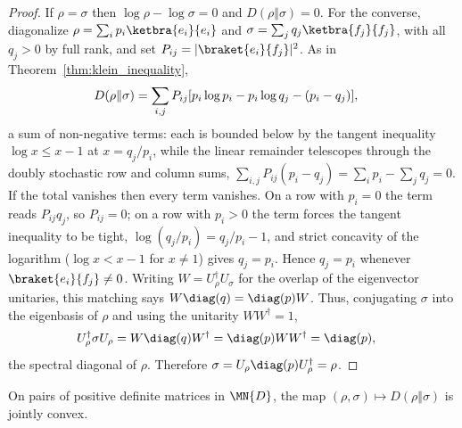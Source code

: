 \begin{proof}\leanok
    If $\rho=\sigma$ then $\log\rho-\log\sigma=0$ and
    $D(\rho\Vert\sigma)=0$.
    For the converse, diagonalize $\rho=\sum_i p_i\ketbra{e_i}{e_i}$ and
    $\sigma=\sum_j q_j\ketbra{f_j}{f_j}$, with all $q_j>0$ by full rank, and set
    $P_{ij}=\lvert\braket{e_i}{f_j}\rvert^2$. As in
    Theorem~\ref{thm:klein_inequality},
    \begin{align}
        D(\rho\Vert\sigma)
         & =\sum_{i,j}P_{ij}
            [p_i\log p_i-p_i\log q_j-(p_i-q_j)],
        \notag
    \end{align}
    a sum of non-negative terms: each is bounded below by the tangent inequality
    $\log x\le x-1$ at $x=q_j/p_i$, while the linear remainder telescopes through
    the doubly stochastic row and column sums,
    $\sum_{i,j}P_{ij}(p_i-q_j)=\sum_ip_i-\sum_jq_j=0$.
    If the total vanishes then every term vanishes. On a row with $p_i=0$ the term
    reads $P_{ij}q_j$, so $P_{ij}=0$; on a row with $p_i>0$ the term forces the
    tangent inequality to be tight,
    $\log(q_j/p_i)=q_j/p_i-1$, and strict concavity of the logarithm
    ($\log x<x-1$ for $x\neq1$) gives $q_j=p_i$. Hence $q_j=p_i$ whenever
    $\braket{e_i}{f_j}\neq0$. Writing $W=U_\rho^\dagger U_\sigma$ for the overlap
    of the eigenvector unitaries, this matching says
    $W\diag(q)=\diag(p)W$. Thus, conjugating $\sigma$ into the eigenbasis of
    $\rho$ and using the unitarity $WW^\dagger=1$,
    \begin{align}
        U_\rho^\dagger\sigma U_\rho
         & =W\diag(q)W^\dagger
        =\diag(p)WW^\dagger
        =\diag(p),
        \notag
    \end{align}
    the spectral diagonal of $\rho$. Therefore
    $\sigma=U_\rho\diag(p)U_\rho^\dagger=\rho$.
\end{proof}

\begin{theorem}
    \label{thm:relative_entropy_joint_convexity}
    \leanok
    On pairs of positive definite matrices in $\MN{D}$, the map
    $(\rho,\sigma)\mapsto D(\rho\Vert\sigma)$ is jointly convex.
\end{theorem}

